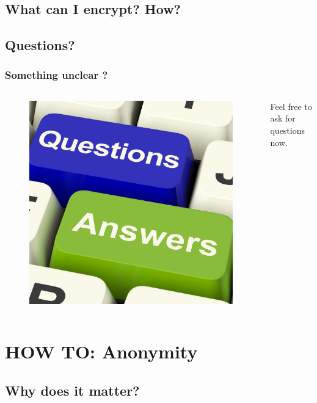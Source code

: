 \documentclass{beamer}
\begin{document}
\subsection{What can I encrypt? How?}
\begin{frame}
\end{frame}

\subsection{Questions?}
\begin{frame}
\frametitle{Something unclear ?}
\begin{columns}[c]
\begin{figure}
\includegraphics[width=0.8\linewidth]{questions}
\end{figure}
Feel free to ask for questions now.
\end{columns}
\end{frame}

\section{HOW TO: Anonymity}
\subsection{Why does it matter?}
\begin{frame}
\end{frame}
\end{document}
